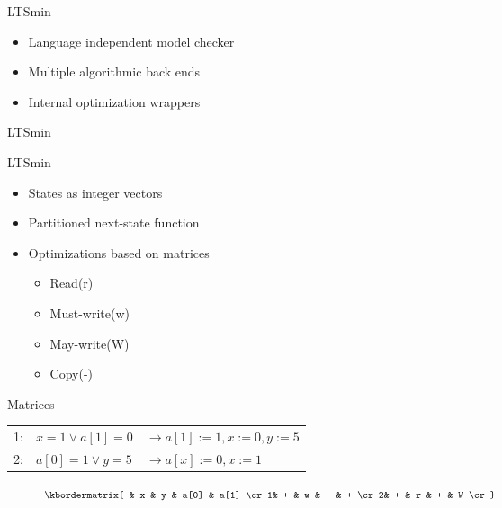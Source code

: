 \begin{frame}{LTSmin}
	\begin{itemize} 
		\item Language independent model checker
		\item Multiple algorithmic back ends
		\item Internal optimization wrappers	
	\end{itemize} 
\end{frame}	
	
\begin{frame}{LTSmin}
\begin{figure}[width=\textwidth] 
\scalebox{0.65}{}
\end{figure}
\end{frame}

\begin{frame}{LTSmin}
	\begin{itemize}
		\item States as integer vectors
	 	\item Partitioned next-state function
	 	\item Optimizations based on matrices
	 	\begin{itemize}
	 		\item Read(r)
	 		\item Must-write(w)
	 		\item May-write(W)
	 		\item Copy(-)
	 	\end{itemize}
	\end{itemize}
\end{frame}

\begin{frame}{Matrices}
\begin{center}
    \begin{tabular}{lll}
    1: & $x = 1 \vee a[1] = 0$ & $\rightarrow a[1] := 1, x:=0 , y:=5$  \\
    2: & $a[0] = 1 \vee y = 5$                     & $\rightarrow a[x] := 0, x:= 1$ \\
    \end{tabular}
\end{center}

\begin{figure}[h]
\centering
	\begin{math}
 \kbordermatrix{ 		               & x & y & a[0] & a[1] \cr
 									  1& + & w & -    & +    \cr
 									  2& + & r & +    & W    \cr}
	\end{math}
\end{figure}
\end{frame}

